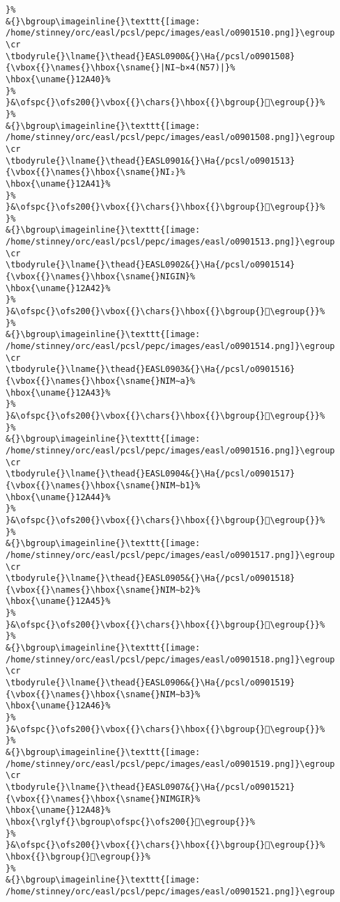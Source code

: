 \begin{verbatim}
}%
&{}\bgroup\imageinline{}\texttt{[image: /home/stinney/orc/easl/pcsl/pepc/images/easl/o0901510.png]}\egroup
\cr
\tbodyrule{}\lname{}\thead{}EASL0900&{}\Ha{/pcsl/o0901508}{\vbox{{}\names{}\hbox{\sname{}|NI∼b×4(N57)|}%
\hbox{\uname{}12A40}%
}%
}&\ofspc{}\ofs200{}\vbox{{}\chars{}\hbox{{}\bgroup{}𒩀\egroup{}}%
}%
&{}\bgroup\imageinline{}\texttt{[image: /home/stinney/orc/easl/pcsl/pepc/images/easl/o0901508.png]}\egroup
\cr
\tbodyrule{}\lname{}\thead{}EASL0901&{}\Ha{/pcsl/o0901513}{\vbox{{}\names{}\hbox{\sname{}NI₂}%
\hbox{\uname{}12A41}%
}%
}&\ofspc{}\ofs200{}\vbox{{}\chars{}\hbox{{}\bgroup{}𒩁\egroup{}}%
}%
&{}\bgroup\imageinline{}\texttt{[image: /home/stinney/orc/easl/pcsl/pepc/images/easl/o0901513.png]}\egroup
\cr
\tbodyrule{}\lname{}\thead{}EASL0902&{}\Ha{/pcsl/o0901514}{\vbox{{}\names{}\hbox{\sname{}NIGIN}%
\hbox{\uname{}12A42}%
}%
}&\ofspc{}\ofs200{}\vbox{{}\chars{}\hbox{{}\bgroup{}𒩂\egroup{}}%
}%
&{}\bgroup\imageinline{}\texttt{[image: /home/stinney/orc/easl/pcsl/pepc/images/easl/o0901514.png]}\egroup
\cr
\tbodyrule{}\lname{}\thead{}EASL0903&{}\Ha{/pcsl/o0901516}{\vbox{{}\names{}\hbox{\sname{}NIM∼a}%
\hbox{\uname{}12A43}%
}%
}&\ofspc{}\ofs200{}\vbox{{}\chars{}\hbox{{}\bgroup{}𒩃\egroup{}}%
}%
&{}\bgroup\imageinline{}\texttt{[image: /home/stinney/orc/easl/pcsl/pepc/images/easl/o0901516.png]}\egroup
\cr
\tbodyrule{}\lname{}\thead{}EASL0904&{}\Ha{/pcsl/o0901517}{\vbox{{}\names{}\hbox{\sname{}NIM∼b1}%
\hbox{\uname{}12A44}%
}%
}&\ofspc{}\ofs200{}\vbox{{}\chars{}\hbox{{}\bgroup{}𒩄\egroup{}}%
}%
&{}\bgroup\imageinline{}\texttt{[image: /home/stinney/orc/easl/pcsl/pepc/images/easl/o0901517.png]}\egroup
\cr
\tbodyrule{}\lname{}\thead{}EASL0905&{}\Ha{/pcsl/o0901518}{\vbox{{}\names{}\hbox{\sname{}NIM∼b2}%
\hbox{\uname{}12A45}%
}%
}&\ofspc{}\ofs200{}\vbox{{}\chars{}\hbox{{}\bgroup{}𒩅\egroup{}}%
}%
&{}\bgroup\imageinline{}\texttt{[image: /home/stinney/orc/easl/pcsl/pepc/images/easl/o0901518.png]}\egroup
\cr
\tbodyrule{}\lname{}\thead{}EASL0906&{}\Ha{/pcsl/o0901519}{\vbox{{}\names{}\hbox{\sname{}NIM∼b3}%
\hbox{\uname{}12A46}%
}%
}&\ofspc{}\ofs200{}\vbox{{}\chars{}\hbox{{}\bgroup{}𒩆\egroup{}}%
}%
&{}\bgroup\imageinline{}\texttt{[image: /home/stinney/orc/easl/pcsl/pepc/images/easl/o0901519.png]}\egroup
\cr
\tbodyrule{}\lname{}\thead{}EASL0907&{}\Ha{/pcsl/o0901521}{\vbox{{}\names{}\hbox{\sname{}NIMGIR}%
\hbox{\uname{}12A48}%
\hbox{\rglyf{}\bgroup\ofspc{}\ofs200{}𒩈\egroup{}}%
}%
}&\ofspc{}\ofs200{}\vbox{{}\chars{}\hbox{{}\bgroup{}𒩇\egroup{}}%
\hbox{{}\bgroup{}𒩈\egroup{}}%
}%
&{}\bgroup\imageinline{}\texttt{[image: /home/stinney/orc/easl/pcsl/pepc/images/easl/o0901521.png]}\egroup

\end{verbatim}
